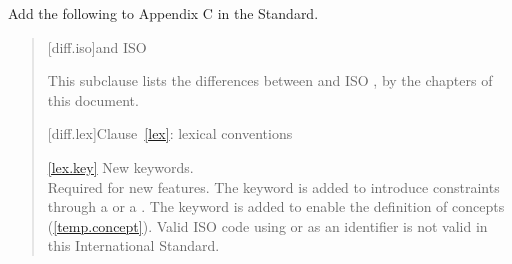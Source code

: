 
Add the following to Appendix C in the \Cpp Standard.

\begin{quote}
\begin{addedblock}
[diff.iso]{\Cpp and ISO }

\pnum
This subclause lists the differences between \Cpp
and ISO , by the chapters of this document.

[diff.lex]{Clause~\ref{lex}: lexical conventions}

\ref{lex.key}
\change New keywords.\\
\rationale Required for new features.
The  keyword is added
to introduce constraints through a  or
a . The  keyword is
added to enable the definition of concepts (\ref{temp.concept}).
\effect
Valid ISO  code using  or 
as an identifier is not valid in this International Standard.

\end{addedblock}
\end{quote}
